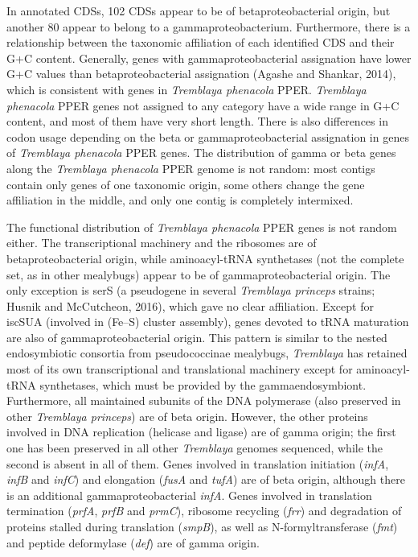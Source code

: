 \documentclass[11pt]{article}
\begin{document}
\begin{sloppypar}
In annotated CDSs, 102 CDSs appear to be of betaproteobacterial origin, but another 80 appear to belong to a gammaproteobacterium. 
Furthermore, there is a relationship between the taxonomic affiliation of each identified CDS and their G+C content. 
Generally, genes with gammaproteobacterial assignation have lower G+C values than betaproteobacterial assignation (Agashe and Shankar, 2014), which is consistent with genes in \textit{Tremblaya phenacola} PPER. 
\textit{Tremblaya phenacola} PPER genes not assigned to any category have a wide range in G+C content, and most
of them have very short length. 
There is also differences in codon usage depending on the beta or gammaproteobacterial assignation in genes of \textit{Tremblaya phenacola} PPER genes. 
The distribution of gamma or beta genes along the \textit{Tremblaya phenacola} PPER genome is not random: most contigs contain only genes of one taxonomic origin, some others change the gene affiliation in the middle, and only one contig 
is completely intermixed. 

\par

The functional distribution of \textit{Tremblaya phenacola} PPER genes is not random either. 
The transcriptional machinery and the ribosomes are of betaproteobacterial origin, while aminoacyl-tRNA synthetases (not the complete set, as in other mealybugs) appear to be of gammaproteobacterial origin. 
The only exception is serS (a pseudogene in several \textit{Tremblaya princeps} strains; Husnik and McCutcheon, 2016), which gave no clear affiliation. 
Except for iscSUA (involved in (Fe–S) cluster assembly), genes devoted to tRNA maturation are also of gammaproteobacterial origin. 
This pattern is similar to the nested endosymbiotic consortia from pseudococcinae mealybugs, \textit{Tremblaya} has retained most of its own transcriptional and translational machinery except for aminoacyl-tRNA synthetases, which must be provided by the gammaendosymbiont. 
Furthermore, all maintained subunits of the DNA polymerase (also preserved in other \textit{Tremblaya princeps}) are of beta origin. 
However, the other proteins involved in DNA replication (helicase and ligase) are of gamma origin; the first one has been preserved in all other \textit{Tremblaya} genomes sequenced, while the second is absent in all of them. 
Genes involved in translation initiation (\textit{infA}, \textit{infB} and \textit{infC}) and elongation (\textit{fusA} and \textit{tufA}) are of beta origin, although there is an additional gammaproteobacterial \textit{infA}. 
Genes involved in translation termination (\textit{prfA}, \textit{prfB} and \textit{prmC}), ribosome recycling (\textit{frr}) and degradation of proteins stalled during translation (\textit{smpB}), as well as N-formyltransferase (\textit{fmt}) and peptide deformylase (\textit{def}) are of gamma origin.


\end{sloppypar}
\end{document}
